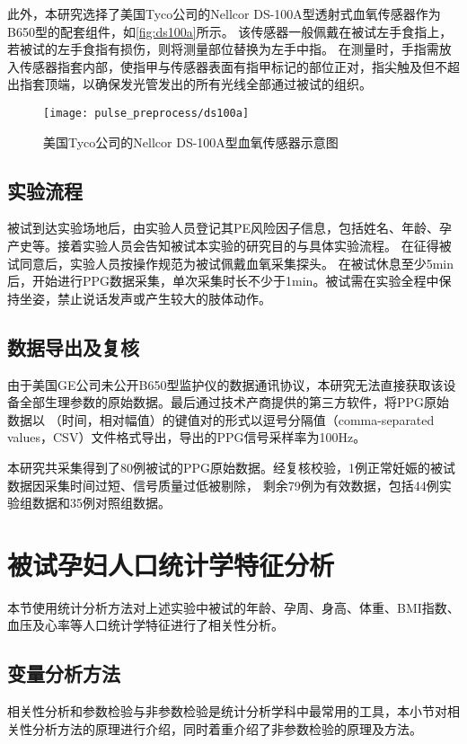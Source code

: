 此外，本研究选择了美国Tyco公司的Nellcor DS-100A型透射式血氧传感器作为B650型的配套组件，如\autoref{fig:ds100a}所示。
该传感器一般佩戴在被试左手食指上，若被试的左手食指有损伤，则将测量部位替换为左手中指。
在测量时，手指需放入传感器指套内部，使指甲与传感器表面有指甲标记的部位正对，指尖触及但不超出指套顶端，以确保发光管发出的所有光线全部通过被试的组织。

\begin{figure}[htbp]
    \centering
    \texttt{[image: pulse\_preprocess/ds100a]}
    \caption{\label{fig:ds100a}美国Tyco公司的Nellcor DS-100A型血氧传感器示意图}
\end{figure}

\subsection{实验流程}
被试到达实验场地后，由实验人员登记其PE风险因子信息，包括姓名、年龄、孕产史等。接着实验人员会告知被试本实验的研究目的与具体实验流程。
在征得被试同意后，实验人员按操作规范为被试佩戴血氧采集探头\cite{Chen2021}。
在被试休息至少5min后，开始进行PPG数据采集，单次采集时长不少于1min。被试需在实验全程中保持坐姿，禁止说话发声或产生较大的肢体动作。

\subsection{数据导出及复核}
由于美国GE公司未公开B650型监护仪的数据通讯协议，本研究无法直接获取该设备全部生理参数的原始数据。最后通过技术产商提供的第三方软件，将PPG原始数据以
（时间，相对幅值）的键值对的形式以逗号分隔值（comma-separated values，CSV）文件格式导出，导出的PPG信号采样率为100Hz。

本研究共采集得到了80例被试的PPG原始数据。经复核校验，1例正常妊娠的被试数据因采集时间过短、信号质量过低被剔除，
剩余79例为有效数据，包括44例实验组数据和35例对照组数据。

\section{被试孕妇人口统计学特征分析}
本节使用统计分析方法对上述实验中被试的年龄、孕周、身高、体重、BMI指数、血压及心率等人口统计学特征进行了相关性分析。

\subsection{变量分析方法}
相关性分析和参数检验与非参数检验是统计分析学科中最常用的工具，本小节对相关性分析方法的原理进行介绍，同时着重介绍了非参数检验的原理及方法。

